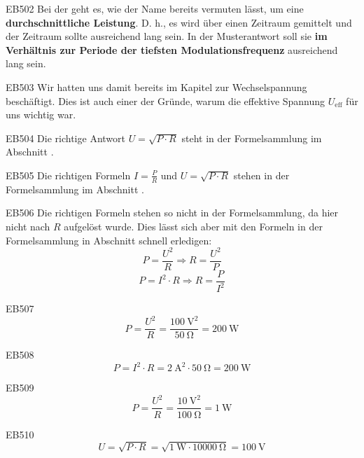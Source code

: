     \begin{sol}{EB502}    
 Bei der  geht es, wie der Name bereits vermuten lässt, um eine \textbf{durchschnittliche Leistung}. D. h., es wird über einen Zeitraum gemittelt und der Zeitraum sollte ausreichend lang sein. In der Musterantwort soll sie \textbf{im Verhältnis zur Periode der tiefsten Modulationsfrequenz} ausreichend lang sein.
    \end{sol}  

   \begin{sol}{EB503}    
    Wir hatten uns damit bereits im Kapitel zur Wechselspannung beschäftigt. Dies ist auch einer der Gründe, warum die effektive Spannung $U_\text{eff}$ für uns wichtig war.
   \end{sol}  


   \begin{sol}{EB504}    
    Die richtige Antwort $U=\sqrt{P\cdot R}$ steht in der Formelsammlung im Abschnitt .
   \end{sol}  

   \begin{sol}{EB505}    
    Die richtigen Formeln $I=\frac{P}{R}$ und $U=\sqrt{P\cdot R}$ stehen in der Formelsammlung im Abschnitt .
   \end{sol}  

   \begin{sol}{EB506}    
    Die richtigen Formeln stehen so nicht in der Formelsammlung, da hier nicht nach $R$ aufgelöst wurde.
    Dies lässt sich aber mit den Formeln in der Formelsammlung in Abschnitt  schnell erledigen:
    $$ P = \frac{U^2}{R} \Rightarrow R = \frac{U^2}{P} $$
    $$ P = I^2 \cdot R \Rightarrow R = \frac{P}{I^2} $$
   \end{sol}  


\begin{sol}{EB507}  
$$P = \frac{U^2}{R} = \frac{\SI{100}{\volt}^2}{\SI{50}{\ohm}} = \SI{200}{\watt}$$
\end{sol}  

\begin{sol}{EB508}  
$$P = I^2\cdot R= \SI{2}{\ampere}^2\cdot \SI{50}{\ohm} = \SI{200}{\watt}$$
\end{sol}  

\begin{sol}{EB509}  
$$P = \frac{U^2}{R} = \frac{\SI{10}{\volt}^2}{\SI{100}{\ohm}}= \SI{1}{\watt}$$
\end{sol} 


\begin{sol}{EB510}  
$$U = \sqrt{P\cdot R} = \sqrt{\SI{1}{\watt}\cdot \SI{10000}{\ohm}}  =\SI{100}{\volt} $$
\end{sol} 


